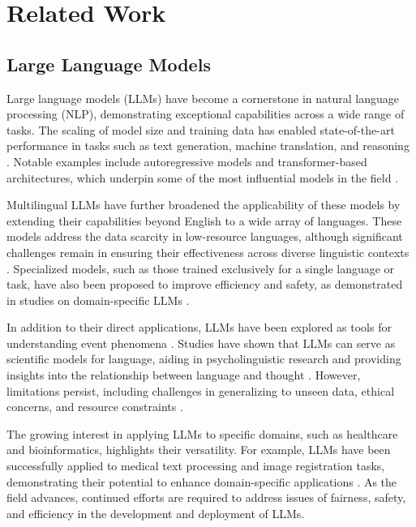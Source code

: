 \section{Related Work}
\subsection{Large Language Models}

Large language models (LLMs) have become a cornerstone in natural language processing (NLP), demonstrating exceptional capabilities across a wide range of tasks. The scaling of model size and training data has enabled state-of-the-art performance in tasks such as text generation, machine translation, and reasoning \cite{zhou2023thread,zhou2021triple}. Notable examples include autoregressive models and transformer-based architectures, which underpin some of the most influential models in the field \cite{nicholas2023lost,mueller2022cedille}.

Multilingual LLMs have further broadened the applicability of these models by extending their capabilities beyond English to a wide array of languages. These models address the data scarcity in low-resource languages, although significant challenges remain in ensuring their effectiveness across diverse linguistic contexts \cite{ojo2023african,chang2024goldfish}. Specialized models, such as those trained exclusively for a single language or task, have also been proposed to improve efficiency and safety, as demonstrated in studies on domain-specific LLMs \cite{ma2024llamareg,liu2024bioinformatics}.

In addition to their direct applications, LLMs have been explored as tools for understanding event phenomena \cite{zhou2022claret,zhou2022eventbert}. Studies have shown that LLMs can serve as scientific models for language, aiding in psycholinguistic research and providing insights into the relationship between language and thought \cite{grindrod2024modelling,houghton2023psycholinguistics}. However, limitations persist, including challenges in generalizing to unseen data, ethical concerns, and resource constraints \cite{veres2022limitations,ali2024survey}.

The growing interest in applying LLMs to specific domains, such as healthcare and bioinformatics, highlights their versatility. For example, LLMs have been successfully applied to medical text processing and image registration tasks, demonstrating their potential to enhance domain-specific applications \cite{ma2024llamareg,liu2024bioinformatics}. As the field advances, continued efforts are required to address issues of fairness, safety, and efficiency in the development and deployment of LLMs.


